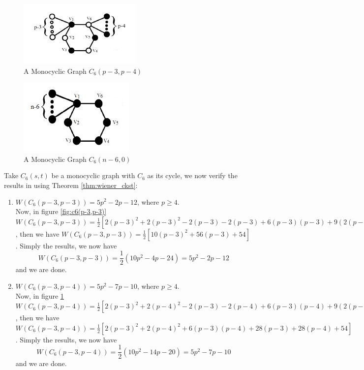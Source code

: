 \begin{e.g.}
\begin{figure}[ht]
\begin{center}
\includegraphics{sample3.jpg}
\end{center}
\caption{A Monocyclic Graph $C_6(p-3,p-4)$}
\label{fig:c6(p-3,p-4)}
\end{figure}

\begin{figure}[!ht]
\begin{center}
\includegraphics{sample4.jpg}
\end{center}
\caption{A Monocyclic Graph $C_6(n-6,0)$}
\label{fig:c6(n-6,0)}
\end{figure}

\begin{e.g.}\rm
Take $C_6(s,t)$ be a monocyclic graph with $C_6$ as its cycle, we now verify the results in \cite{wiener_ind_bipart} using Theorem \ref{thm:wiener_ckst}:
\begin{enumerate}
\item {$W(C_6(p-3,p-3))=5p^2-2p-12$, where $p\geq 4$.\\
Now, in figure \ref{fig:c6(p-3,p-3)}
$W(C_6(p-3,p-3))=\frac{1}{2}[2(p-3)^2+2(p-3)^2-2(p-3)-2(p-3)+6(p-3)(p-3)+9(2(p-3)+2(p-3)+6)+12(p-3)+12(p-3)]$, then we have $W(C_6(p-3,p-3))=\frac{1}{2}[10(p-3)^2+56(p-3)+54]$. Simply the results, we now have
$$
W(C_6(p-3,p-3))=\frac{1}{2}(10p^2-4p-24)=5p^2-2p-12
$$ 
and we are done.
}

\item {$W(C_6(p-3,p-4))=5p^2-7p-10$, where $p\geq 4$.\\
Now, in figure \ref{fig:c6(p-3,p-4)}
$W(C_6(p-3,p-4))=\frac{1}{2}[2(p-3)^2+2(p-4)^2-2(p-3)-2(p-4)+6(p-3)(p-4)+9(2(p-3)+2(p-4)+6)+12(p-3)+12(p-4)]$, then we have $W(C_6(p-3,p-4))=\frac{1}{2}[2(p-3)^2+2(p-4)^2+6(p-3)(p-4)+28(p-3)+28(p-4)+54]$. Simply the results, we now have
$$
W(C_6(p-3,p-4))=\frac{1}{2}(10p^2-14p-20)=5p^2-7p-10
$$ 
and we are done.}


\end{enumerate}
\end{e.g.}
\end{e.g.}
